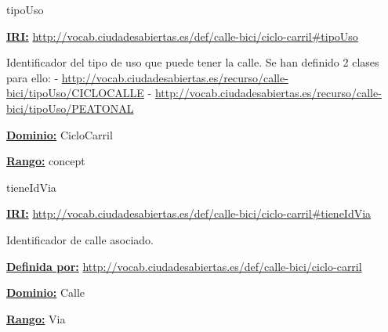 \begin{mybox}{tipoUso}
\begin{flushleft}
\underline{\textbf{IRI:}}
\url{http://vocab.ciudadesabiertas.es/def/calle-bici/ciclo-carril#tipoUso}
\newline

Identificador del tipo de uso que puede tener la calle. Se han definido 2 clases para ello:
\newline -	\url{http://vocab.ciudadesabiertas.es/recurso/calle-bici/tipoUso/CICLOCALLE}
\newline -	 \url{http://vocab.ciudadesabiertas.es/recurso/calle-bici/tipoUso/PEATONAL}
\newline



\underline{\textbf{Dominio:}}
\newline CicloCarril

\underline{\textbf{Rango:}}
		concept


\end{flushleft}
\end{mybox}






\begin{mybox}{tieneIdVia}
\begin{flushleft}
\underline{\textbf{IRI:}}
\url{http://vocab.ciudadesabiertas.es/def/calle-bici/ciclo-carril#tieneIdVia}
\newline

Identificador de calle asociado.
\newline

\underline{\textbf{Definida por:}}
\url{http://vocab.ciudadesabiertas.es/def/calle-bici/ciclo-carril}
\newline

\underline{\textbf{Dominio:}}
		Calle
\newline

\underline{\textbf{Rango:}}
		Via
\newline


\end{flushleft}
\end{mybox}





